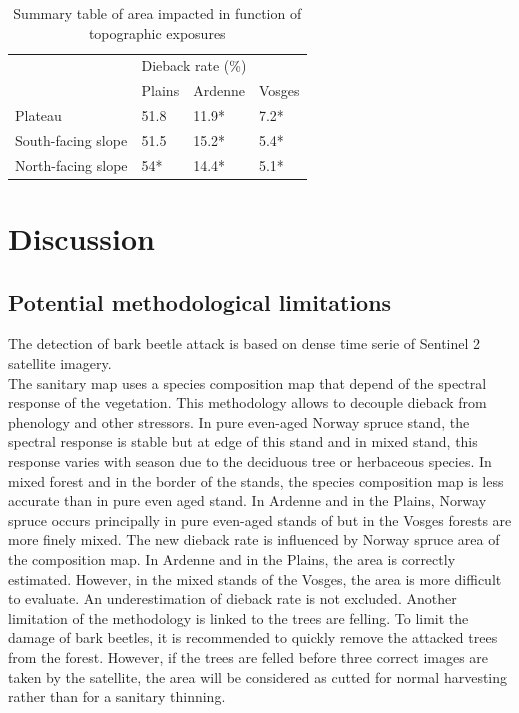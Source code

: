 \documentclass[3p,procedia]{elsarticle}
\begin{document}
\begin{table}[htbp]
\caption{Summary table of area impacted in function of topographic exposures}
\label{tab_or_topo}

\begin{tabular}{|l|lll|}
\hline
\multirow{2}{*}{}  & \multicolumn{3}{l|}{Dieback rate (\%)}                             \\ \cline{2-4} 
                   & \multicolumn{1}{l|}{Plains} & \multicolumn{1}{l|}{Ardenne} & Vosges \\ \hline
Plateau            & \multicolumn{1}{l|}{51.8}    & \multicolumn{1}{l|}{11.9*}    & 7.2*   \\ \hline
South-facing slope & \multicolumn{1}{l|}{51.5}   & \multicolumn{1}{l|}{15.2*}    & 5.4*    \\ \hline
North-facing slope & \multicolumn{1}{l|}{54*}   & \multicolumn{1}{l|}{14.4*}    & 5.1*   \\ \hline
\end{tabular}
\end{table}

   

\section{Discussion}

\subsection{Potential methodological limitations}
The detection of bark beetle attack is based on dense time serie of Sentinel 2 satellite imagery. \\
The sanitary map uses a species composition map that depend of the spectral response of the vegetation.
This methodology allows to decouple dieback from phenology and other stressors.
In pure even-aged Norway spruce stand, the spectral response is stable but at edge of this stand and in mixed stand, this response varies with season due to the deciduous tree or herbaceous species.
In mixed forest and in the border of the stands, the species composition map is less accurate than in pure even aged stand.
In Ardenne and in the Plains, Norway spruce occurs principally in pure even-aged stands of  but in the Vosges forests are more finely mixed.
The new dieback rate is influenced by Norway spruce area of the composition map.
In Ardenne and in the Plains, the area is correctly estimated.
However, in the mixed stands of the  Vosges, the area is more difficult to evaluate.
An underestimation of dieback rate is not excluded.
Another limitation of the methodology is linked to the trees are felling.
To limit the damage of bark beetles, it is recommended to quickly remove the attacked trees from the forest.
However, if the trees are felled before three correct images are taken by the satellite, the area will be considered as cutted for normal harvesting  rather than for a sanitary thinning.  
 
\end{document}
